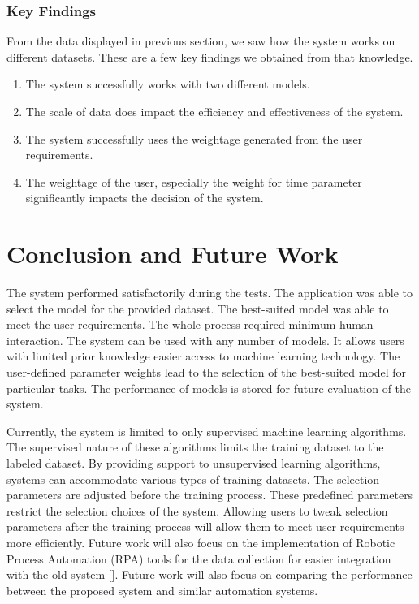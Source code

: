 \documentclass[a4paper,fleqn]{cas-dc}
\newcommand{\responsemod}{\color{blue}}
\begin{document}
\subsubsection*{Key Findings}\label{subsubsec:key_findings}

From the data displayed in previous section, we saw how the system works on different datasets. These are a few key findings we obtained from that knowledge.
\begin{enumerate}
    \item The system successfully works with two different models.
    \item The scale of data does impact the efficiency and effectiveness of the system.
    \item The system successfully uses the weightage generated from the user requirements.
    \item The weightage of the user, especially the weight for time parameter significantly impacts the decision of the system.
\end{enumerate}

{\responsemod
\section{Conclusion and Future Work}\label{sec:conclusion_and_futur_work}

The system performed satisfactorily during the tests. The application was able to select the model for the provided dataset. The best-suited model was able to meet the user requirements. The whole process required minimum human interaction. The system can be used with any number of models. It allows users with limited prior knowledge easier access to machine learning technology. The user-defined parameter weights lead to the selection of the best-suited model for particular tasks. The performance of models is stored for future evaluation of the system.

Currently, the system is limited to only supervised machine learning algorithms. The supervised nature of these algorithms limits the training dataset to the labeled dataset. By providing support to unsupervised learning algorithms, systems can accommodate various types of training datasets. The selection parameters are adjusted before the training process. These predefined parameters restrict the selection choices of the system. Allowing users to tweak selection parameters after the training process will allow them to meet user requirements more efficiently. Future work will also focus on the implementation of Robotic Process Automation (RPA) tools for the data collection for easier integration with the old system []. Future work will also focus on comparing the performance between the proposed system and similar automation systems.
}
\end{document}
